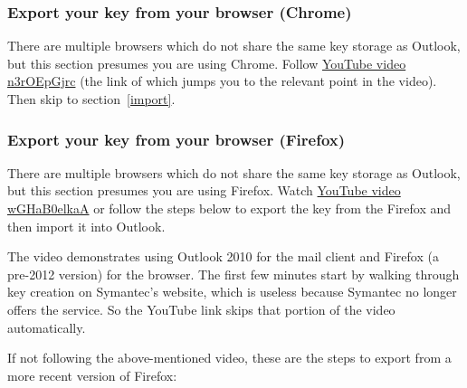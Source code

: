 \documentclass[pdftex,12pt,titlepage=false]{scrartcl}
\begin{document}
\subsubsection{Export your key from your browser (Chrome)}\label{chrome_export}
There are multiple browsers which do not share the same key storage as
Outlook, but this section presumes you are using Chrome.  Follow
\href{https://www.youtube.com/watch?v=n3rOEpGjrc\&start=310}{YouTube
  video n3rOEpGjrc} (the link of which jumps you to the relevant point
in the video).  Then skip to section~\ref{import}.

\subsubsection{Export your key from your browser (Firefox)}\label{ff_export}
There are multiple browsers which do not share the same key storage as
Outlook, but this section presumes you are using Firefox.  Watch
\href{https://www.youtube.com/watch?v=wGHaB0elkaA\&start=226}{YouTube
  video wGHaB0elkaA} or follow the steps below to export the key from
the Firefox and then import it into Outlook.

The video demonstrates using Outlook 2010 for the mail client and
Firefox (a pre-2012 version) for the browser.  The first few minutes
start by walking through key creation on Symantec's website, which is
useless because Symantec no longer offers the service.  So the YouTube
link skips that portion of the video automatically.

If not following the above-mentioned video, these are the steps to
export from a more recent version of Firefox:
\end{document}
